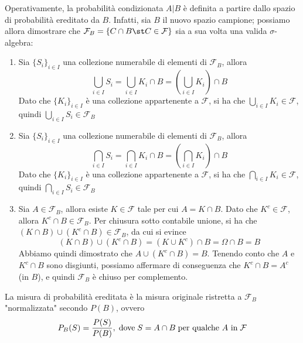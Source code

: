         Operativamente, la probabilità condizionata $A | B$ è definita a partire dallo spazio di probabilità ereditato da $B$.
        Infatti, sia $B$ il nuovo spazio campione; possiamo allora dimostrare che $\mathcal{F}_{B} = \{ C \cap B \st C \in \mathcal{F}\}$ sia a sua volta una valida $\sigma$-algebra:
        \begin{enumerate}
            \item Sia $\{S_{i}\}_{i \in I}$ una collezione numerabile di elementi di $\mathcal{F}_{B}$, allora
            \[
                \bigcup_{i \in I} S_{i} = \bigcup_{i \in I} K_{i} \cap B = \left(\bigcup_{i \in I} K_{i}\right) \cap B
            \]
            Dato che $\{K_{i}\}_{i \in I}$ è una collezione appartenente a $\mathcal{F}$, si ha che $\displaystyle \bigcup_{i \in I} K_{i} \in \mathcal{F}$, quindi $\displaystyle \bigcup_{i \in I} S_{i} \in \mathcal{F}_{B}$

            \item Sia $\{S_{i}\}_{i \in I}$ una collezione numerabile di elementi di $\mathcal{F}_{B}$, allora
            \[
                \bigcap_{i \in I} S_{i} = \bigcap_{i \in I} K_{i} \cap B = \left(\bigcap_{i \in I} K_{i}\right) \cap B
            \]
            Dato che $\{K_{i}\}_{i \in I}$ è una collezione appartenente a $\mathcal{F}$, si ha che $\displaystyle \bigcap_{i \in I} K_{i} \in \mathcal{F}$, quindi $\displaystyle \bigcap_{i \in I} S_{i} \in \mathcal{F}_{B}$

            \item Sia $A \in \mathcal{F}_{B}$, allora esiste $K \in \mathcal{F}$ tale per cui $A = K \cap B$.
            Dato che $K^{c} \in \mathcal{F}$, allora $K^{c} \cap B \in \mathcal{F}_{B}$.
            Per chiusura sotto contabile unione, si ha che $(K \cap B) \cup (K^{c} \cap B) \in \mathcal{F}_{B}$, da cui si evince
            \[
                (K \cap B) \cup (K^{c} \cap B) = (K \cup K^{c}) \cap B = \Omega \cap B = B
            \]
            Abbiamo quindi dimostrato che $A \cup (K^{c} \cap B) = B$. Tenendo conto che $A$ e $K^{c} \cap B$ sono disgiunti, possiamo affermare di conseguenza che $K^{c} \cap B = A^{c}$ (in $B$), e quindi $\mathcal{F}_{B}$ è chiuso per complemento.
        \end{enumerate}

        La misura di probabilità ereditata è la misura originale ristretta a $\mathcal{F}_{B}$ "normalizzata" secondo $P(B)$, ovvero
        \[
            P_{B}(S) = \frac{P(S)}{P(B)}, \; \textnormal{dove} \; S = A \cap B \; \textnormal{per qualche $A$ in} \; \mathcal{F}
        \]

